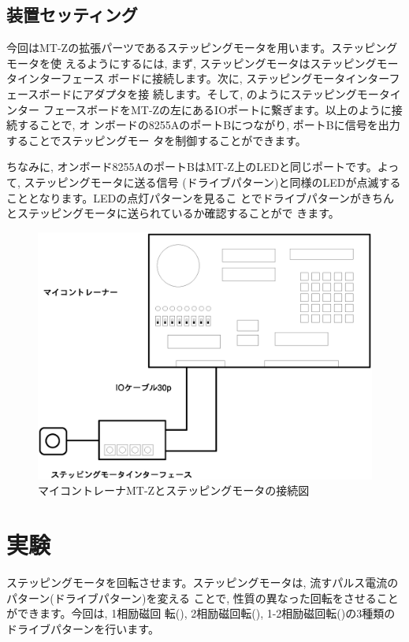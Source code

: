\subsection{装置セッティング}

今回はMT-Zの拡張パーツであるステッピングモータを用います。ステッピングモータを使
えるようにするには, まず, ステッピングモータはステッピングモータインターフェース
ボードに接続します。次に, ステッピングモータインターフェースボードにアダプタを接
続します。そして, のようにステッピングモータインター
フェースボードをMT-Zの左にあるIOポートに繋ぎます。以上のように接続することで, オ
ンボードの8255AのポートBにつながり, ポートBに信号を出力することでステッピングモー
タを制御することができます。

ちなみに, オンボード8255AのポートBはMT-Z上のLEDと同じポートです。よって, ステッピングモータに送る信号
(ドライブパターン)と同様のLEDが点滅することとなります。LEDの点灯パターンを見るこ
とでドライブパターンがきちんとステッピングモータに送られているか確認することがで
きます。


\begin{figure}[htbp]
\begin{center}
\includegraphics[width=0.8\linewidth]{img/connection-motor.eps}
\caption{マイコントレーナMT-Zとステッピングモータの接続図}
\label{fig:connection-motor}
\end{center}
\end{figure}

\section{実験}
ステッピングモータを回転させます。ステッピングモータは, 流すパルス電流のパターン(ドライブパターン)を変える
ことで, 性質の異なった回転をさせることができます。今回は, 1相励磁回
転(), 2相励磁回転(), 1-2相励磁回転()の3種類のドライブパターンを行います。


